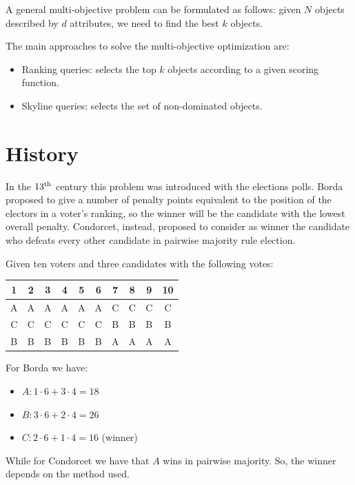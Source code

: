 \documentclass[12pt, a4paper]{report}
\newtheorem[style=M,bodystyle=\normalfont]{theorem}{Theorem}
\newtheorem[style=M,bodystyle=\normalfont]{corollary}{Corollary}
\newtheorem[style=M,bodystyle=\normalfont]{lemma}{Lemma}
\newtheorem[style=M,bodystyle=\normalfont]{definition}{Definition}
\begin{document}
    A general multi-objective problem can be formulated as follows: given $N$ objects described by $d$ attributes, we need to find the best $k$ objects. 
    
    The main approaches to solve the multi-objective optimization are: 
    \begin{itemize}
        \item Ranking queries: selects the top $k$ objects according to a given scoring function.
        \item Skyline queries: selects the set of non-dominated objects. 
    \end{itemize}

    \section{History}
    In the $13^{\textnormal{th}}$ century this problem was introduced with the elections polls. Borda proposed to give a number of penalty points equivalent to the position 
    of the electors in a voter's ranking, so the winner will be the candidate with the lowest overall penalty. Condorcet, instead, proposed to consider as winner the candidate who 
    defeats every other candidate in pairwise majority rule election.
    \begin{example}
        Given ten voters and three candidates with the following votes: 
        \begin{table}[H]
            \centering
            \begin{tabular}{|c|c|c|c|c|c|c|c|c|c|}
            \hline
            1 & 2 & 3 & 4 & 5 & 6 & 7 & 8 & 9 & 10 \\ \hline
            A & A & A & A & A & A & C & C & C & C  \\ 
            C & C & C & C & C & C & B & B & B & B  \\ 
            B & B & B & B & B & B & A & A & A & A  \\ \hline
            \end{tabular}
        \end{table}
        For Borda we have: 
        \begin{itemize}
            \item $A: 1 \cdot 6+3 \cdot 4 = 18$
            \item $B: 3 \cdot 6+2 \cdot 4 = 26$
            \item $C: 2 \cdot 6+1 \cdot 4 = 16$ (winner)
        \end{itemize}
        While for Condorcet we have that $A$ wins in pairwise majority. So, the winner depends on the method used. 
    \end{example}
\end{document}
